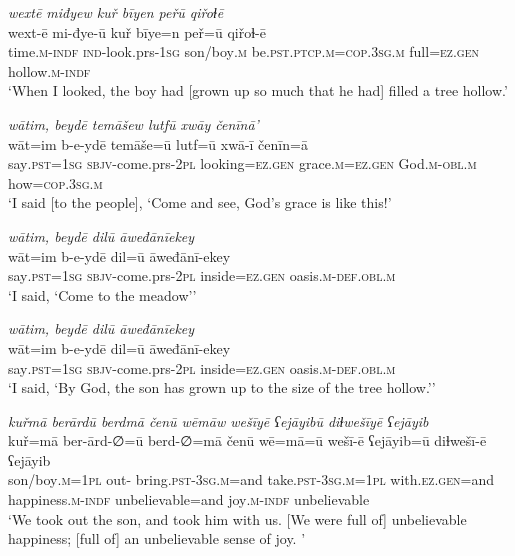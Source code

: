 \ea \label{ZQ.45}
\textit{wextē miđyew kuř bīyen peřū qiřoɫē} \\ 
\gll wext-ē mi-đye-ū kuř bīye=n peř=ū qiřoɫ-ē \\ 
 time\textsc{.m}\textsc{-indf} \textsc{ind-}look.prs\textsc{-\textsc{1sg}} son/boy\textsc{.m} be\textsc{.pst}\textsc{.ptcp}\textsc{.m}\textsc{=cop}\textsc{.3sg}\textsc{.m} full\textsc{=ez.gen} hollow\textsc{.m}\textsc{-indf} \\ 
\glt `When I looked, the boy had [grown up so much that he had] filled a tree hollow.'
\z 
 
\ea \label{ZQ.46}
\textit{wātim, beydē temāšew lutfū xwāy čenīnā’} \\ 
\gll wāt=im b-e-ydē temāše=ū lutf=ū xwā-ī čenīn=ā \\ 
 say\textsc{.pst}\textsc{=\textsc{1sg}} \textsc{sbjv-}come.prs-\textsc{2pl} looking\textsc{=ez.gen} grace\textsc{.m}\textsc{=ez.gen} God\textsc{.m}\textsc{-obl}\textsc{.m} how\textsc{=cop}\textsc{.3sg}\textsc{.m} \\ 
\glt `I said [to the people], ‘Come and see, God’s grace is like this!'
\z 
 
\ea \label{ZQ.48}
\textit{wātim, beydē dilū āweđānīekey} \\ 
\gll wāt=im b-e-ydē dil=ū āweđānī-ekey \\ 
 say\textsc{.pst}\textsc{=\textsc{1sg}} \textsc{sbjv-}come.prs-\textsc{2pl} inside\textsc{=ez.gen} oasis\textsc{.m}\textsc{-def}\textsc{.obl}\textsc{.m} \\ 
\glt `I said, ‘Come to the meadow’'
\z 
 
\ea \label{ZQ.50}
\textit{wātim, beydē dilū āweđānīekey} \\ 
\gll wāt=im b-e-ydē dil=ū āweđānī-ekey \\ 
 say\textsc{.pst}\textsc{=\textsc{1sg}} \textsc{sbjv-}come.prs-\textsc{2pl} inside\textsc{=ez.gen} oasis\textsc{.m}\textsc{-def}\textsc{.obl}\textsc{.m} \\ 
\glt `I said, ‘By God, the son has grown up to the size of the tree hollow.’'
\z 
 
\ea \label{ZQ.53}
\textit{kuřmā berārdū berdmā čenū wēmāw wešīyē ʕejāyibū diɫwešīyē ʕejāyib} \\ 
\gll kuř=mā ber-ārd-∅=ū berd-∅=mā čenū wē=mā=ū wešī-ē ʕejāyib=ū diɫwešī-ē ʕejāyib \\ 
 son/boy\textsc{.m}\textsc{=\textsc{1pl}} out- bring\textsc{.pst}\textsc{-3sg}\textsc{.m}=and take\textsc{.pst}\textsc{-3sg}\textsc{.m}\textsc{=\textsc{1pl}} with\textsc{.ez.gen}=and happiness\textsc{.m}\textsc{-indf} unbelievable=and joy\textsc{.m}\textsc{-indf} unbelievable \\ 
\glt `We took out the son, and took him with us. [We were full of] unbelievable happiness; [full of] an unbelievable sense of joy. '
\z 
 

